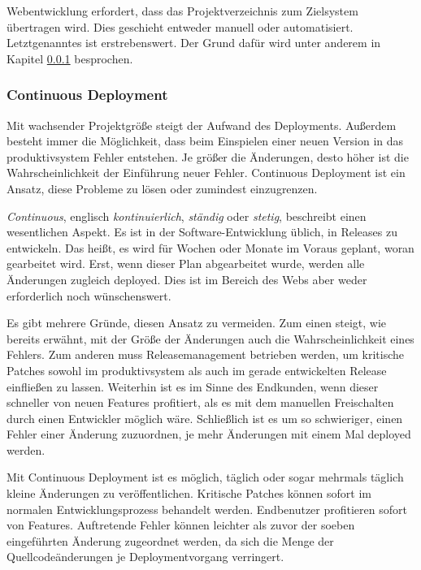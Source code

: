 Webentwicklung erfordert, dass das Projektverzeichnis zum Zielsystem übertragen wird. Dies geschieht entweder manuell oder automatisiert. Letztgenanntes ist erstrebenswert. Der Grund dafür wird unter anderem in Kapitel \ref{ssub:continuous_deployment} besprochen.


\subsubsection{Continuous Deployment} %
\label{ssub:continuous_deployment}

Mit wachsender Projektgröße steigt der Aufwand des Deployments. Außerdem besteht immer die Möglichkeit, dass beim Einspielen einer neuen Version in das \gls{produktivsystem} Fehler entstehen. Je größer die Änderungen, desto höher ist die Wahrscheinlichkeit der Einführung neuer Fehler. Continuous Deployment ist ein Ansatz, diese Probleme zu lösen oder zumindest einzugrenzen.

\emph{Continuous}, englisch \emph{kontinuierlich}, \emph{ständig} oder \emph{stetig}, beschreibt einen wesentlichen Aspekt. Es ist in der Software-Entwicklung üblich, in Releases zu entwickeln. Das heißt, es wird für Wochen oder Monate im Voraus geplant, woran gearbeitet wird. Erst, wenn dieser Plan abgearbeitet wurde, werden alle Änderungen zugleich deployed. Dies ist im Bereich des Webs aber weder erforderlich noch wünschenswert.

Es gibt mehrere Gründe, diesen Ansatz zu vermeiden. Zum einen steigt, wie bereits erwähnt, mit der Größe der Änderungen auch die Wahrscheinlichkeit eines Fehlers. Zum anderen muss Releasemanagement betrieben werden, um kritische Patches sowohl im \gls{produktivsystem} als auch im gerade entwickelten Release einfließen zu lassen. Weiterhin ist es im Sinne des Endkunden, wenn dieser schneller von neuen Features profitiert, als es mit dem manuellen Freischalten durch einen Entwickler möglich wäre. Schließlich ist es um so schwieriger, einen Fehler einer Änderung zuzuordnen, je mehr Änderungen mit einem Mal deployed werden.

Mit Continuous Deployment ist es möglich, täglich oder sogar mehrmals täglich kleine Änderungen zu veröffentlichen. Kritische Patches können sofort im normalen Entwicklungsprozess behandelt werden. Endbenutzer profitieren sofort von Features. Auftretende Fehler können leichter als zuvor der soeben eingeführten Änderung zugeordnet werden, da sich die Menge der Quellcodeänderungen je Deploymentvorgang verringert.

